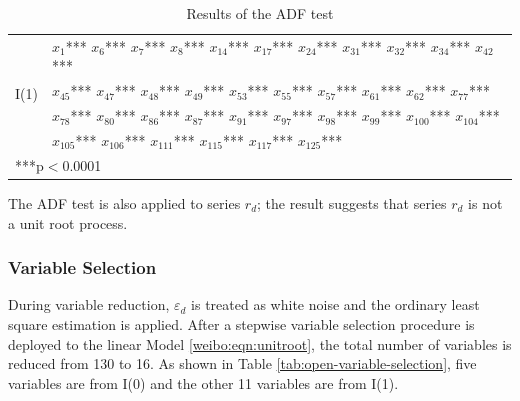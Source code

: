 \documentclass[review,3p,times,12pt,number]{elsarticle}
\begin{document}
\begin{table}[htbp]
\caption{Results of the ADF test}
\label{tab:adf-test}
\center
\begin{tabular} {l l}
\hline
\multirow{4}{*}{I(1)}
&  $x_1$*** $x_6$*** $x_7$*** $x_8$*** $x_{14}$*** $x_{17}$*** $x_{24}$*** $x_{31}$*** $x_{32}$*** $x_{34}$*** $x_{42}$***\\
& $x_{45}$*** $x_{47}$*** $x_{48}$*** $x_{49}$*** $x_{53}$*** $x_{55}$*** $x_{57}$*** $x_{61}$*** $x_{62}$*** $x_{77}$***\\
& $x_{78}$*** $x_{80}$*** $x_{86}$*** $x_{87}$*** $x_{91}$*** $x_{97}$*** $x_{98}$*** $x_{99}$*** $x_{100}$*** $x_{104}$***\\
& $x_{105}$*** $x_{106}$*** $x_{111}$*** $x_{115}$*** $x_{117}$*** $x_{125}$*** \\
\hline
\multicolumn{2}{l}{***p$<$0.0001}
\end{tabular}
\end{table}

The ADF test is also applied to series $r_d$; the result suggests that series $r_d$ is not a unit root process.

\subsubsection{Variable Selection}

During variable reduction, $\varepsilon_d$ is treated as white noise and the ordinary least square estimation is applied. After a stepwise variable selection procedure is deployed to the linear Model \ref{weibo:eqn:unitroot}, the total number of variables is reduced from 130 to 16. As shown in Table \ref{tab:open-variable-selection}, five variables are from I(0) and the other 11 variables are from I(1).
\end{document}
